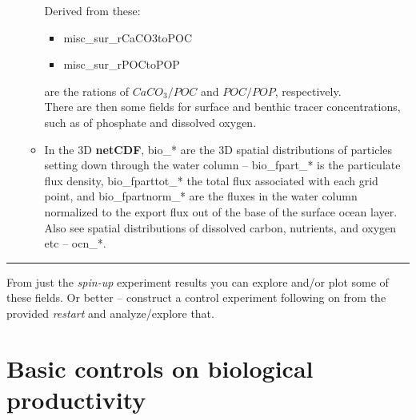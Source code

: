 \begin{itemize}[noitemsep]
\begin{itemize}[noitemsep]
\vspace{1mm}
Derived from these:
\vspace{1mm}
\begin{itemize}[noitemsep]
\item [] \textsf{\footnotesize misc\_sur\_rCaCO3toPOC}
\item [] \textsf{\footnotesize misc\_sur\_rPOCtoPOP}
\end{itemize}
are the rations of \(CaCO_{3}/POC\) and \(POC/POP\), respectively.
\vspace{1mm}
\\There are then some fields for surface and benthic tracer concentrations, such as of phosphate and dissolved oxygen.
\vspace{1mm}
\item In the 3D \textbf{netCDF}, \textsf{\footnotesize bio\_*} are the 3D spatial distributions of particles setting down through the water column -- \textsf{\footnotesize bio\_fpart\_*} is the particulate flux density, \textsf{\footnotesize bio\_fparttot\_*} the total flux associated with each grid point, and \textsf{\footnotesize bio\_fpartnorm\_*} are the fluxes in the water column normalized to the export flux out of the base of the surface ocean layer.
\vspace{1mm}
\\Also see spatial distributions of dissolved carbon, nutrients, and oxygen etc -- \textsf{\footnotesize ocn\_*}.
\end{itemize} 

\end{itemize}

\vspace{1mm}
\noindent\rule{4cm}{0.5pt}
\vspace{2mm}

\noindent From just the \textit{spin-up} experiment results you can explore and/or plot some of these fields. Or better -- construct a control experiment following on from the provided \textit{restart} and analyze/explore that.

\newpage

\section{Basic controls on biological productivity}

